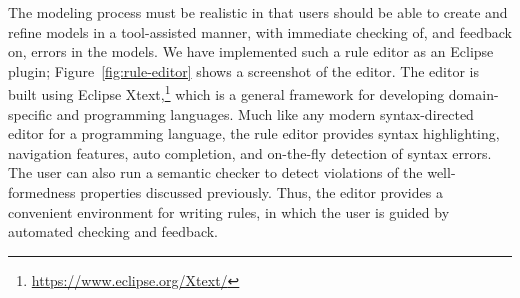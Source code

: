 The modeling process must be realistic in that users should be able to create
and refine models in a tool-assisted manner, with immediate checking of, and
feedback on, errors in the models.  We have implemented such a rule editor as an
Eclipse plugin; Figure~\ref{fig:rule-editor} shows a screenshot of the
editor. The editor is built using Eclipse Xtext,\footnote{\scriptsize
  \url{https://www.eclipse.org/Xtext/}} which is a general framework for
developing domain-specific and programming languages. Much like any modern
syntax-directed editor for a programming language, the rule editor provides
syntax highlighting, navigation features, auto completion, and on-the-fly
detection of syntax errors.  The user can also run a semantic checker to detect
violations of the well-formedness properties discussed previously. Thus, the
editor provides a convenient environment for writing rules, in which the user is
guided by automated checking and feedback.
